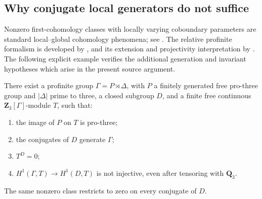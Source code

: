 \subsection{Why conjugate local generators do not suffice}

Nonzero first-cohomology classes with locally varying coboundary parameters
are standard local--global cohomology phenomena; see
\citet[\S2 and Examples~3.4--3.6, pp.~321 and 327--328]{DvornicichZannier2001}.
The relative profinite formalism is developed by
\citet[\S2.1, Proposition~2.4]{WilkesRelative2019}, and its extension and
projectivity interpretation by \citet{WilkesRelative2025}.
The following explicit example verifies the additional generation and
invariant hypotheses which arise in the present source argument.

\begin{proposition}\label{prop:conjugate-source-not-enough}
There exist a profinite group \(\Gamma=P\rtimes\Delta\), with \(P\) a
finitely generated free pro-three group and \(|\Delta|\) prime to three,
a closed subgroup \(D\), and a finite free continuous
\(\mathbf Z_3[\Gamma]\)-module \(T\), such that:
\begin{enumerate}
\item the image of \(P\) on \(T\) is pro-three;
\item the conjugates of \(D\) generate \(\Gamma\);
\item \(T^D=0\);
\item \(H^1(\Gamma,T)\longrightarrow H^1(D,T)\) is not injective,
even after tensoring with \(\mathbf Q_3\).
\end{enumerate}
The same nonzero class restricts to zero on every conjugate of \(D\).
\end{proposition}
